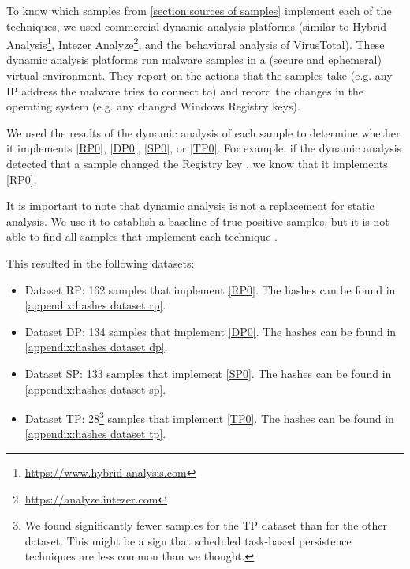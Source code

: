 To know which samples from \autoref{section:sources of samples} implement each of the techniques, we used commercial dynamic analysis platforms (similar to Hybrid Analysis\footnote{\tiny \url{https://www.hybrid-analysis.com}}, Intezer Analyze\footnote{\tiny \url{https://analyze.intezer.com}}, and the behavioral analysis of VirusTotal\cite{virustotal-behavioural}). These dynamic analysis platforms run malware samples in a (secure and ephemeral) virtual environment. They report on the actions that the samples take (e.g. any IP address the malware tries to connect to) and record the changes in the operating system (e.g. any changed Windows Registry keys).

We used the results of the dynamic analysis of each sample to determine whether it implements \autoref{RP0}, \autoref{DP0}, \autoref{SP0}, or \autoref{TP0}. For example, if the dynamic analysis detected that a sample changed the Registry key , we know that it implements \autoref{RP0}.

\medskip

It is important to note that dynamic analysis is not a replacement for static analysis. We use it to establish a baseline of true positive samples, but it is not able to find all samples that implement each technique \cite{survey-anti-analysis}.

\medskip

This resulted in the following datasets:
\begin{itemize}
    \item Dataset RP: 162 samples that implement \autoref{RP0}. The hashes can be found in \autoref{appendix:hashes dataset rp}.
    \item Dataset DP: 134 samples that implement \autoref{DP0}. The hashes can be found in \autoref{appendix:hashes dataset dp}.
    \item Dataset SP: 133 samples that implement \autoref{SP0}. The hashes can be found in \autoref{appendix:hashes dataset sp}.
    \item Dataset TP: 28\footnote{We found significantly fewer samples for the TP dataset than for the other dataset. This might be a sign that scheduled task-based persistence techniques are less common than we thought.} samples that implement \autoref{TP0}. The hashes can be found in \autoref{appendix:hashes dataset tp}.
\end{itemize}

